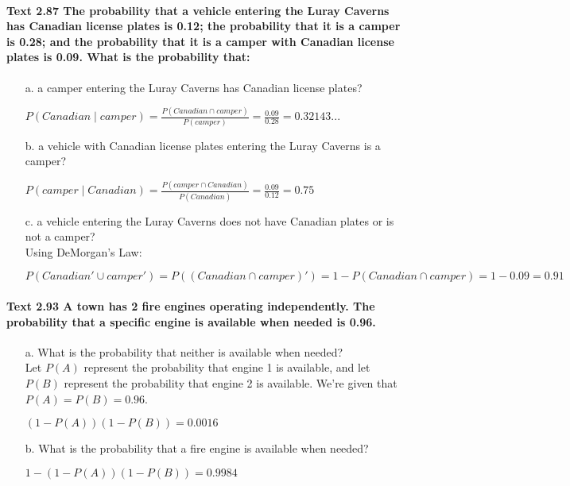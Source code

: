 \documentclass{article}
\begin{document}
\paragraph{Text 2.87 The probability that a vehicle entering the Luray Caverns 
has Canadian license plates is 0.12; the probability that it is a camper is 
0.28; and the probability that it is a camper with Canadian license plates is 
0.09. What is the probability that:}
\begin{enumerate}
\item[a.] a camper entering the Luray Caverns has Canadian license plates?
\begin{center}
$\boxed{P(Canadian \mid camper) = \frac{P(Canadian \cap camper)}{P(camper)} = 
\frac{0.09}{0.28} = 0.32143...}$
\end{center}
\item[b.] a vehicle with Canadian license plates entering the Luray Caverns is a 
camper?
\begin{center}
$\boxed{P(camper \mid Canadian) = \frac{P(camper \cap Canadian)}{P(Canadian)} = 
\frac{0.09}{0.12} = 0.75}$
\end{center}
\item[c.] a vehicle entering the Luray Caverns does not have Canadian plates or 
is not a camper?\\
Using DeMorgan's Law:
\begin{center}
$\boxed{P(Canadian' \cup camper') = P((Canadian \cap camper)') = 
1 - P(Canadian \cap camper) = 1-0.09 = 0.91}$
\end{center}
\end{enumerate}

\paragraph{Text 2.93 A town has 2 fire engines operating independently. The 
probability that a specific engine is available when needed is 0.96.}
\begin{enumerate}
\item[a.] What is the probability that neither is available when needed?\\
Let $P(A)$ represent the probability that engine 1 is available, and let $P(B)$ 
represent the probability that engine 2 is available. We're given that 
$P(A) = P(B) = 0.96$.
\begin{center}
$\boxed{(1 - P(A))(1 - P(B)) = 0.0016}$
\end{center}
\item[b.] What is the probability that a fire engine is available when needed?
\begin{center}
$\boxed{1-(1-P(A))(1-P(B)) = 0.9984}$
\end{center}
\end{enumerate}
\end{document}

